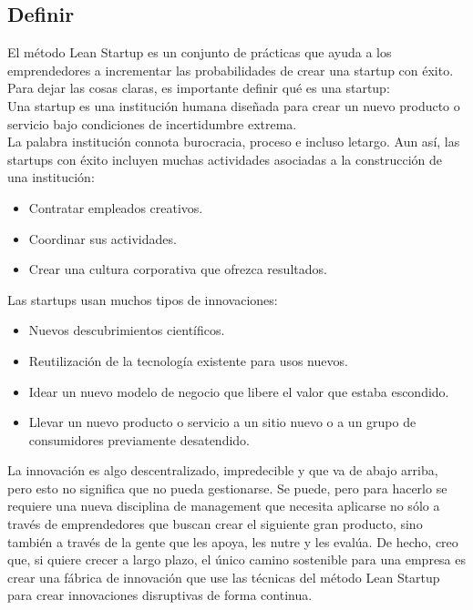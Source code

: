 \documentclass[10pt]{article}
\begin{document}
\begin{multicols}{2}
\section*{Definir}
El método Lean Startup es un conjunto de prácticas que ayuda a los emprendedores a incrementar las probabilidades de crear una startup con éxito. Para dejar las cosas claras, es importante definir qué es una startup:\\
{\color{blue}Una startup es una institución humana diseñada para crear un nuevo producto o servicio bajo condiciones de incertidumbre extrema.}\\
La palabra institución connota burocracia, proceso e incluso letargo. Aun así, las startups con éxito incluyen muchas actividades asociadas a la construcción de una institución:
\begin{itemize}
\item Contratar empleados creativos.
\item Coordinar sus actividades.
\item Crear una cultura corporativa que ofrezca resultados.
\end{itemize}
Las startups usan muchos tipos de innovaciones:
\begin{itemize}
\item Nuevos descubrimientos científicos.
\item Reutilización de la tecnología existente para usos nuevos.
\item Idear un nuevo modelo de negocio que libere el valor que estaba escondido.
\item Llevar un nuevo producto o servicio a un sitio nuevo o a un grupo de consumidores previamente desatendido.
\end{itemize}
{\color{blue}La innovación es algo descentralizado, impredecible y que va de abajo arriba, pero esto no significa que no pueda gestionarse. Se puede, pero para hacerlo se requiere una nueva disciplina de management que necesita aplicarse no sólo a través de emprendedores que buscan crear el siguiente gran producto, sino también a través de la gente que les apoya, les nutre y les evalúa.}
De hecho, creo que, si quiere crecer a largo plazo, el único camino sostenible para una empresa es crear una fábrica de innovación que use las técnicas del método Lean Startup para crear innovaciones disruptivas de forma continua.

\end{multicols}
\end{document}
